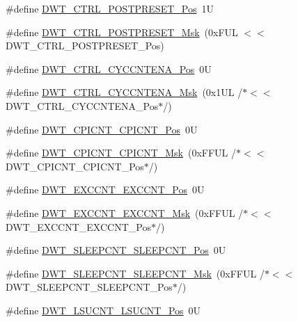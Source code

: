\begin{DoxyCompactItemize}
\item 
\#define \hyperlink{group___c_m_s_i_s___d_w_t_ga129bc152febfddd67a0c20c6814cba69}{D\+W\+T\+\_\+\+C\+T\+R\+L\+\_\+\+P\+O\+S\+T\+P\+R\+E\+S\+E\+T\+\_\+\+Pos}~1U
\item 
\#define \hyperlink{group___c_m_s_i_s___d_w_t_ga11d9e1e2a758fdd2657aa68ce61b9c9d}{D\+W\+T\+\_\+\+C\+T\+R\+L\+\_\+\+P\+O\+S\+T\+P\+R\+E\+S\+E\+T\+\_\+\+Msk}~(0x\+F\+U\+L $<$$<$ D\+W\+T\+\_\+\+C\+T\+R\+L\+\_\+\+P\+O\+S\+T\+P\+R\+E\+S\+E\+T\+\_\+\+Pos)
\item 
\#define \hyperlink{group___c_m_s_i_s___d_w_t_gaa4509f5f8514a7200be61691f0e01f10}{D\+W\+T\+\_\+\+C\+T\+R\+L\+\_\+\+C\+Y\+C\+C\+N\+T\+E\+N\+A\+\_\+\+Pos}~0U
\item 
\#define \hyperlink{group___c_m_s_i_s___d_w_t_ga4a9d209dc2a81ea6bfa0ea21331769d3}{D\+W\+T\+\_\+\+C\+T\+R\+L\+\_\+\+C\+Y\+C\+C\+N\+T\+E\+N\+A\+\_\+\+Msk}~(0x1\+U\+L /$\ast$$<$$<$ D\+W\+T\+\_\+\+C\+T\+R\+L\+\_\+\+C\+Y\+C\+C\+N\+T\+E\+N\+A\+\_\+\+Pos$\ast$/)
\item 
\#define \hyperlink{group___c_m_s_i_s___d_w_t_ga80e9ad8f6a9e2344af8a3cf989bebe3d}{D\+W\+T\+\_\+\+C\+P\+I\+C\+N\+T\+\_\+\+C\+P\+I\+C\+N\+T\+\_\+\+Pos}~0U
\item 
\#define \hyperlink{group___c_m_s_i_s___d_w_t_ga76f39e7bca3fa86a4dbf7b8f6adb7217}{D\+W\+T\+\_\+\+C\+P\+I\+C\+N\+T\+\_\+\+C\+P\+I\+C\+N\+T\+\_\+\+Msk}~(0x\+F\+F\+U\+L /$\ast$$<$$<$ D\+W\+T\+\_\+\+C\+P\+I\+C\+N\+T\+\_\+\+C\+P\+I\+C\+N\+T\+\_\+\+Pos$\ast$/)
\item 
\#define \hyperlink{group___c_m_s_i_s___d_w_t_ga031c693654030d4cba398b45d2925b1d}{D\+W\+T\+\_\+\+E\+X\+C\+C\+N\+T\+\_\+\+E\+X\+C\+C\+N\+T\+\_\+\+Pos}~0U
\item 
\#define \hyperlink{group___c_m_s_i_s___d_w_t_ga057fa604a107b58a198bbbadb47e69c9}{D\+W\+T\+\_\+\+E\+X\+C\+C\+N\+T\+\_\+\+E\+X\+C\+C\+N\+T\+\_\+\+Msk}~(0x\+F\+F\+U\+L /$\ast$$<$$<$ D\+W\+T\+\_\+\+E\+X\+C\+C\+N\+T\+\_\+\+E\+X\+C\+C\+N\+T\+\_\+\+Pos$\ast$/)
\item 
\#define \hyperlink{group___c_m_s_i_s___d_w_t_ga0371a84a7996dc5852c56afb2676ba1c}{D\+W\+T\+\_\+\+S\+L\+E\+E\+P\+C\+N\+T\+\_\+\+S\+L\+E\+E\+P\+C\+N\+T\+\_\+\+Pos}~0U
\item 
\#define \hyperlink{group___c_m_s_i_s___d_w_t_ga1e340751d71413fef400a0a1d76cc828}{D\+W\+T\+\_\+\+S\+L\+E\+E\+P\+C\+N\+T\+\_\+\+S\+L\+E\+E\+P\+C\+N\+T\+\_\+\+Msk}~(0x\+F\+F\+U\+L /$\ast$$<$$<$ D\+W\+T\+\_\+\+S\+L\+E\+E\+P\+C\+N\+T\+\_\+\+S\+L\+E\+E\+P\+C\+N\+T\+\_\+\+Pos$\ast$/)
\item 
\#define \hyperlink{group___c_m_s_i_s___d_w_t_gab9394c7911b0b4312a096dad91d53a3d}{D\+W\+T\+\_\+\+L\+S\+U\+C\+N\+T\+\_\+\+L\+S\+U\+C\+N\+T\+\_\+\+Pos}~0U
$$
\end{DoxyCompactItemize}
